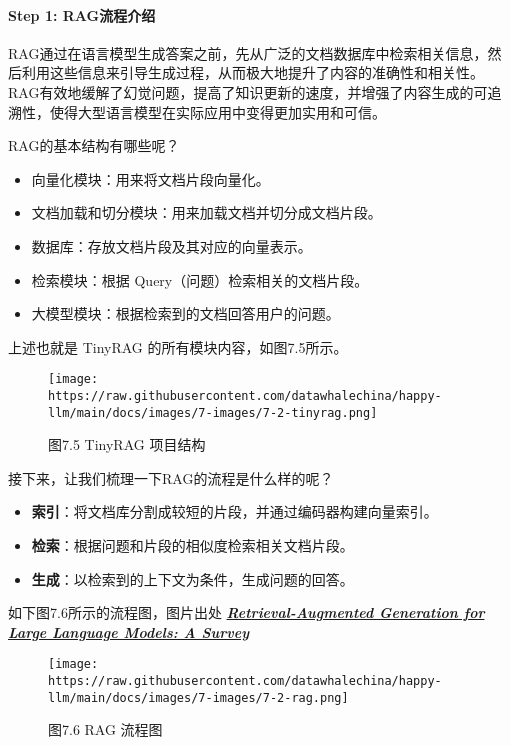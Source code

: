 \documentclass[12pt,a4paper]{book}
\begin{document}
\paragraph{Step 1:
RAG流程介绍}\label{step-1-ragux6d41ux7a0bux4ecbux7ecd}

RAG通过在语言模型生成答案之前，先从广泛的文档数据库中检索相关信息，然后利用这些信息来引导生成过程，从而极大地提升了内容的准确性和相关性。RAG有效地缓解了幻觉问题，提高了知识更新的速度，并增强了内容生成的可追溯性，使得大型语言模型在实际应用中变得更加实用和可信。

RAG的基本结构有哪些呢？

\begin{itemize}
\tightlist
\item
  向量化模块：用来将文档片段向量化。
\item
  文档加载和切分模块：用来加载文档并切分成文档片段。
\item
  数据库：存放文档片段及其对应的向量表示。
\item
  检索模块：根据 Query（问题）检索相关的文档片段。
\item
  大模型模块：根据检索到的文档回答用户的问题。
\end{itemize}

上述也就是 TinyRAG 的所有模块内容，如图7.5所示。

\begin{figure}[htbp]\centering
\texttt{[image: https://raw.githubusercontent.com/datawhalechina/happy-llm/main/docs/images/7-images/7-2-tinyrag.png]}
\caption{图7.5 TinyRAG 项目结构}
\end{figure}

接下来，让我们梳理一下RAG的流程是什么样的呢？

\begin{itemize}
\tightlist
\item
  \textbf{索引}：将文档库分割成较短的片段，并通过编码器构建向量索引。
\item
  \textbf{检索}：根据问题和片段的相似度检索相关文档片段。
\item
  \textbf{生成}：以检索到的上下文为条件，生成问题的回答。
\end{itemize}

如下图7.6所示的流程图，图片出处
\textbf{\emph{\href{https://arxiv.org/pdf/2312.10997.pdf}{Retrieval-Augmented
Generation for Large Language Models: A Survey}}}

\begin{figure}[htbp]\centering
\texttt{[image: https://raw.githubusercontent.com/datawhalechina/happy-llm/main/docs/images/7-images/7-2-rag.png]}
\caption{图7.6 RAG 流程图}
\end{figure}
\end{document}

